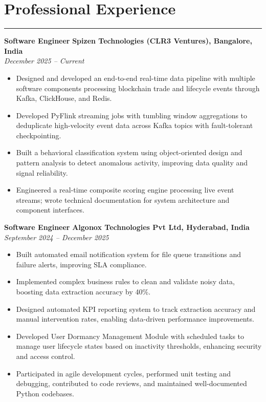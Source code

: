 \documentclass[12pt]{article}
\begin{document}
\section*{Professional Experience}
\vspace{1pt}\hrule\vspace{4pt}

\textbf{Software Engineer} \hfill \textbf{Spizen Technologies (CLR3 Ventures), Bangalore, India} \\
\textit{December 2025 -- Current}
\begin{itemize}
  \item Designed and developed an end-to-end real-time data pipeline with multiple software components processing blockchain trade and lifecycle events through Kafka, ClickHouse, and Redis.
  \item Developed PyFlink streaming jobs with tumbling window aggregations to deduplicate high-velocity event data across Kafka topics with fault-tolerant checkpointing.
  \item Built a behavioral classification system using object-oriented design and pattern analysis to detect anomalous activity, improving data quality and signal reliability.
  \item Engineered a real-time composite scoring engine processing live event streams; wrote technical documentation for system architecture and component interfaces.
\end{itemize}

\textbf{Software Engineer} \hfill \textbf{Algonox Technologies Pvt Ltd, Hyderabad, India} \\
\textit{September 2024 -- December 2025}
\begin{itemize}
  \item Built automated email notification system for file queue transitions and failure alerts, improving SLA compliance.
  \item Implemented complex business rules to clean and validate noisy data, boosting data extraction accuracy by 40\%.
  \item Designed automated KPI reporting system to track extraction accuracy and manual intervention rates, enabling data-driven performance improvements.
  \item Developed User Dormancy Management Module with scheduled tasks to manage user lifecycle states based on inactivity thresholds, enhancing security and access control.
  \item Participated in agile development cycles, performed unit testing and debugging, contributed to code reviews, and maintained well-documented Python codebases.
\end{itemize}
\end{document}
